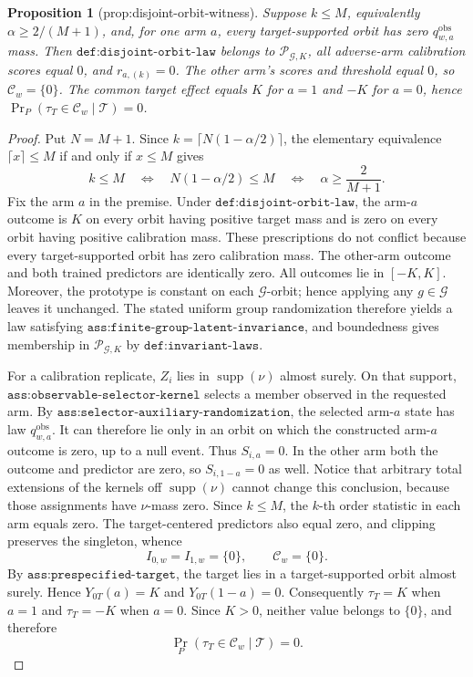 \documentclass{article}
\newtheorem{proposition}{Proposition}
\begin{document}
\begin{proposition}[prop:disjoint-orbit-witness]\label{prop:disjoint-orbit-witness}
Suppose \(k\le M\), equivalently \(\alpha\ge2/(M+1)\), and, for one arm \(a\), every target-supported orbit has zero \(q^{\mathrm{obs}}_{w,a}\) mass. Then \(\texttt{def:disjoint-orbit-law}\) belongs to \(\mathcal P_{\mathcal G,K}\), all adverse-arm calibration scores equal \(0\), and \(r_{a,(k)}=0\). The other arm's scores and threshold equal \(0\), so \(\mathcal C_w=\{0\}\). The common target effect equals \(K\) for \(a=1\) and \(-K\) for \(a=0\), hence \(\Pr_P(\tau_T\in\mathcal C_w\mid\mathcal T)=0\).
\end{proposition}
\begin{proof}
Put \(N=M+1\). Since \(k=\lceil N(1-\alpha/2)\rceil\), the elementary equivalence \(\lceil x\rceil\le M\) if and only if \(x\le M\) gives
\[
k\le M\quad\Longleftrightarrow\quad N(1-\alpha/2)\le M\quad\Longleftrightarrow\quad \alpha\ge \frac{2}{M+1}.
\]
Fix the arm \(a\) in the premise. Under \(\texttt{def:disjoint-orbit-law}\), the arm-\(a\) outcome is \(K\) on every orbit having positive target mass and is zero on every orbit having positive calibration mass. These prescriptions do not conflict because every target-supported orbit has zero calibration mass. The other-arm outcome and both trained predictors are identically zero. All outcomes lie in \([-K,K]\). Moreover, the prototype is constant on each \(\mathcal G\)-orbit; hence applying any \(g\in\mathcal G\) leaves it unchanged. The stated uniform group randomization therefore yields a law satisfying \(\texttt{ass:finite-group-latent-invariance}\), and boundedness gives membership in \(\mathcal P_{\mathcal G,K}\) by \(\texttt{def:invariant-laws}\).

For a calibration replicate, \(Z_i\) lies in \(\operatorname{supp}(\nu)\) almost surely. On that support, \(\texttt{ass:observable-selector-kernel}\) selects a member observed in the requested arm. By \(\texttt{ass:selector-auxiliary-randomization}\), the selected arm-\(a\) state has law \(q^{\mathrm{obs}}_{w,a}\). It can therefore lie only in an orbit on which the constructed arm-\(a\) outcome is zero, up to a null event. Thus \(S_{i,a}=0\). In the other arm both the outcome and predictor are zero, so \(S_{i,1-a}=0\) as well. Notice that arbitrary total extensions of the kernels off \(\operatorname{supp}(\nu)\) cannot change this conclusion, because those assignments have \(\nu\)-mass zero. Since \(k\le M\), the \(k\)-th order statistic in each arm equals zero. The target-centered predictors also equal zero, and clipping preserves the singleton, whence
\[
I_{0,w}=I_{1,w}=\{0\},\qquad \mathcal C_w=\{0\}.
\]
By \(\texttt{ass:prespecified-target}\), the target lies in a target-supported orbit almost surely. Hence \(Y_{0T}(a)=K\) and \(Y_{0T}(1-a)=0\). Consequently \(\tau_T=K\) when \(a=1\) and \(\tau_T=-K\) when \(a=0\). Since \(K>0\), neither value belongs to \(\{0\}\), and therefore
\[
\Pr_P(\tau_T\in\mathcal C_w\mid\mathcal T)=0.
\]
\end{proof}
\end{document}
